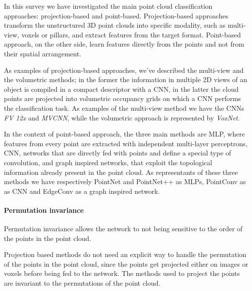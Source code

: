 In this survey we have investigated the main point cloud classification approaches: projection-based and point-based. Projection-based approaches transform the unstructured 3D point clouds into specific modality, such as multi-view, voxels or pillars, and extract features from the target format. Point-based approach, on the other side, learn features directly from the points and not from their spatial arrangement.

As examples of projection-based approaches, we've described the multi-view and the volumetric methods; in the former the information in multiple 2D views of an object is compiled in a compact descriptor with a CNN, in the latter the cloud points are projected into volumetric occupancy grids on which a CNN performs the classification task. As examples of the multi-view method we have the CNNs \textit{FV 12x} and \textit{MVCNN}, while the volumetric approach is represented by \textit{VoxNet}.

In the context of point-based approach, the three main methods are MLP, where features from every point are extracted with independent multi-layer perceptrons, CNN, networks that are directly fed with points and define a special type of convolution, and graph inspired networks, that exploit the topological information already present in the point cloud. As representants of these three methods we have respectively PointNet and PointNet++ as MLPs, PointConv as as CNN and EdgeConv as a graph inspired network.


\paragraph{Permutation invariance} Permutation invariance allows the network to not being sensitive to the order of the points in the point cloud.

Projection based methods do not need an explicit way to handle the permutation of the points in the point cloud, since the points get projected either on images or voxels before being fed to the network. The methods used to project the points are invariant to the permutations of the point cloud.

